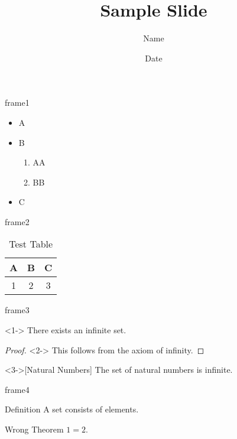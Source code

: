 \documentclass[17pt,aspectratio=169,dvipdfmx]{beamer}
\title{Sample Slide}
\author{Name}
\date{Date}
\begin{document}
\maketitle{}

\begin{frame}{frame1}
  \begin{itemize}
      \item A
      \item B
    \begin{enumerate}
        \item AA
        \item BB
    \end{enumerate}
      \item C
  \end{itemize}
\end{frame}

\begin{frame}{frame2}

  {\color{base}{base color}}

  {\color{fontc}{font color}}

  {\color{sub1}{sub color 1}}

  {\color{sub2}{sub color 2}}

  \begin{table}[b]
    \centering
    \begin{tabular}{ccc}
      \hline
      A & B & C \\\hline
      1 & 2 & 3 \\\hline
    \end{tabular}
    \caption{Test Table}
  \end{table}

\end{frame}

\begin{frame}{frame3}

  \begin{theorem}<1->
     There exists an infinite set.
   \end{theorem}

   \begin{proof}<2->
     This follows from the axiom of infinity.
   \end{proof}

   \begin{example}<3->[Natural Numbers]
     The set of natural numbers is infinite.
   \end{example}

\end{frame}

\begin{frame}{frame4}

  \begin{block}{Definition}
    A \alert{set} consists of elements.
  \end{block}

  \begin{alertblock}{Wrong Theorem}
    $1=2$.
  \end{alertblock}

\end{frame}
\end{document}
